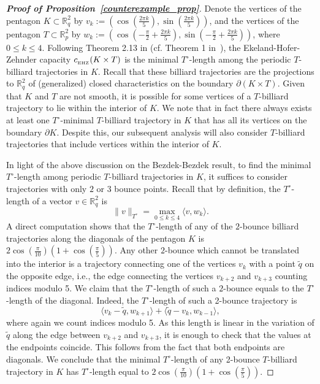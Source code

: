 \documentclass[10pt,a4paper]{article}
\theoremstyle{definition}
\newcommand{\R}{{\mathbb{R}}}
\newcommand{\ehzcap}{c_{_{\rm EHZ}}}
\begin{document}
\begin{proof}[{\bf Proof of Proposition~\ref{counterexample_prop}}]
  
Denote the vertices of the pentagon $K \subset \R^2_q$ by $v_k := (\cos(\frac{2\pi k}{5}), \sin(\frac{2\pi k}{5}))$, and the vertices of the pentagon $T \subset \R^2_p$ by  $w_k:= (\cos(-\frac{\pi}{2} + \frac{2\pi k}{5}), \sin(-\frac{\pi}{2} + \frac{2\pi k}{5}))$, where $0 \leq k \leq 4$. Following Theorem 2.13 in \cite{singular_capacity} (cf. Theorem 1 in~\cite{Mink-Bill-Rudolf}), the Ekeland-Hofer-Zehnder capacity $\ehzcap(K \times T)$ is the minimal $T^\circ$-length among the periodic $T$-billiard trajectories in $K$. Recall that these billiard trajectories are the projections to $\R^2_q$ of (generalized) closed characteristics on the boundary $\partial (K \times T)$. 
Given that $K$ and $T$ are not smooth, it is possible for some vertices of a $T$-billiard trajectory to lie within the interior of $K$. We note that in fact there always exists at least one $T^\circ$-minimal $T$-billiard trajectory in $K$ that has all its vertices on the boundary $\partial K$. Despite this, our subsequent analysis will also  consider $T$-billiard trajectories that include vertices within the interior of $K$.

\medskip 


In light of the above discussion on the Bezdek-Bezdek result, to find the minimal $T^{\circ}$-length  among periodic $T$-billiard trajectories in $K$, it suffices to consider trajectories with only $2$ or $3$ bounce points. Recall that by definition, the $T^\circ$-length of a vector $v \in \R^2_q$ is 
\begin{equation} \label{eqn-T-dual-length} \|v\|_{T^\circ} = \max_{0\leq k \leq 4} \langle v, w_k \rangle. \end{equation}
A direct computation shows that the $T^{\circ}$-length of any  of the $2$-bounce billiard trajectories along the diagonals of the pentagon $K$ is
$ 2 \cos(\frac{\pi}{10}) (1 + \cos(\frac{\pi}{5}))$. 
Any other $2$-bounce which cannot be translated into the interior is a trajectory connecting one of the vertices $v_k$ with a point 
$\widetilde q$ on the opposite edge, i.e., the edge connecting the vertices $v_{k+2}$ and $v_{k+3}$ counting indices modulo 5.
We claim that the $T^\circ$-length of such a $2$-bounce equals to the $T^\circ$-length of the diagonal.
Indeed, the $T^\circ$-length of such a 2-bounce trajectory is  $$\langle v_k - \widetilde q, w_{k+1} \rangle + \langle \widetilde q - v_k, w_{k-1} \rangle,$$
where again we count indices modulo 5. 
As this length is linear in the variation of $\widetilde q$ along the edge between $v_{k+2}$ and $v_{k+3}$,
it is enough to check  that the values at the endpoints coincide. This follows from the fact that 
both endpoints are diagonals.
We conclude that the minimal $T^\circ$-length of any 2-bounce $T$-billiard trajectory in $K$ has $T^\circ$-length equal to
$ 2 \cos(\frac{\pi}{10}) (1 + \cos(\frac{\pi}{5}))$. 


\end{proof}
\end{document}
